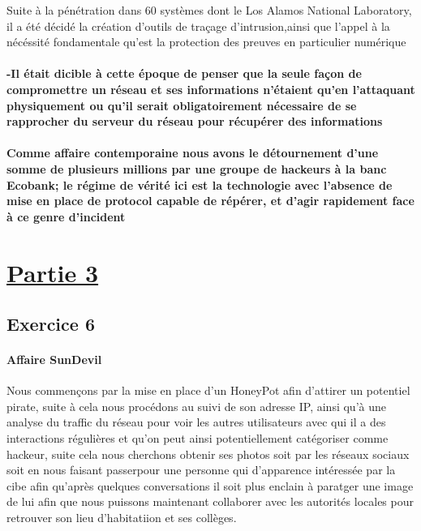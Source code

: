 \documentclass{article}
\begin{document}
Suite à la pénétration dans 60 systèmes dont le Los Alamos National Laboratory, il a été décidé la création d'outils de traçage d'intrusion,\newline ainsi que l'appel à la nécéssité fondamentale qu'est la protection des preuves en particulier numérique

\paragraph{-Il était dicible à cette époque de penser que la seule façon de compromettre un réseau et ses informations n'étaient qu'en l'attaquant physiquement ou qu'il serait obligatoirement nécessaire de se rapprocher du serveur du réseau pour récupérer des informations}

\paragraph{Comme affaire contemporaine nous avons le détournement d'une somme de plusieurs millions par une groupe de hackeurs à la banc Ecobank; le régime de vérité ici est  la technologie avec l'absence de mise en place de protocol capable de répérer, et d'agir rapidement face à ce genre d'incident }

\section{\underline{Partie 3}}
\subsection{Exercice 6}
\paragraph{ Affaire SunDevil}
Nous commençons par la mise en place d'un HoneyPot afin d'attirer un potentiel pirate, suite à cela nous procédons au suivi de son adresse IP, ainsi qu'à une analyse du traffic du réseau pour voir les autres utilisateurs avec qui il a des \newline interactions régulières et qu'on peut ainsi potentiellement catégoriser comme hackeur, suite cela nous cherchons obtenir ses photos soit par les réseaux sociaux soit en nous faisant passer\newline pour une personne qui d'apparence intéressée par la cibe afin qu'après quelques conversations il soit plus enclain à paratger une image de lui afin que nous puissons maintenant collaborer avec les autorités locales pour retrouver son lieu d'habitatiion et ses collèges.
\end{document}
